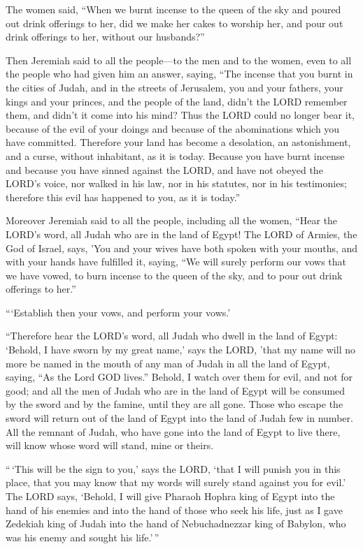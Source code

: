  The women said, ``When we burnt incense to the queen of
the sky and poured out drink offerings to her, did we make her cakes to
worship her, and pour out drink offerings to her, without our
husbands?''

 Then Jeremiah said to all the people---to the men and to
the women, even to all the people who had given him an answer, saying,
 ``The incense that you burnt in the cities of Judah, and
in the streets of Jerusalem, you and your fathers, your kings and your
princes, and the people of the land, didn't the LORD remember them, and
didn't it come into his mind?  Thus the LORD could no
longer bear it, because of the evil of your doings and because of the
abominations which you have committed. Therefore your land has become a
desolation, an astonishment, and a curse, without inhabitant, as it is
today.  Because you have burnt incense and because you
have sinned against the LORD, and have not obeyed the LORD's voice, nor
walked in his law, nor in his statutes, nor in his testimonies;
therefore this evil has happened to you, as it is today.''

 Moreover Jeremiah said to all the people, including all
the women, ``Hear the LORD's word, all Judah who are in the land of
Egypt!  The LORD of Armies, the God of Israel, says, 'You
and your wives have both spoken with your mouths, and with your hands
have fulfilled it, saying, ``We will surely perform our vows that we
have vowed, to burn incense to the queen of the sky, and to pour out
drink offerings to her.''

```Establish then your vows, and perform your vows.'

 ``Therefore hear the LORD's word, all Judah who dwell in
the land of Egypt: `Behold, I have sworn by my great name,' says the
LORD, 'that my name will no more be named in the mouth of any man of
Judah in all the land of Egypt, saying, ``As the Lord GOD lives.''
 Behold, I watch over them for evil, and not for good;
and all the men of Judah who are in the land of Egypt will be consumed
by the sword and by the famine, until they are all gone. 
Those who escape the sword will return out of the land of Egypt into the
land of Judah few in number. All the remnant of Judah, who have gone
into the land of Egypt to live there, will know whose word will stand,
mine or theirs.

 ``\,`This will be the sign to you,' says the LORD, `that
I will punish you in this place, that you may know that my words will
surely stand against you for evil.'  The LORD says,
`Behold, I will give Pharaoh Hophra king of Egypt into the hand of his
enemies and into the hand of those who seek his life, just as I gave
Zedekiah king of Judah into the hand of Nebuchadnezzar king of Babylon,
who was his enemy and sought his life.'\,''

